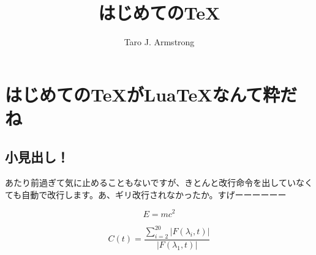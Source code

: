 \documentclass{ltjsarticle}
\begin{document}
\title{はじめての\TeX }
\author{Taro J. Armstrong}
\maketitle
\section{はじめての\TeX がLua\TeX なんて粋だね}

\subsection{小見出し！}
あたり前過ぎて気に止めることもないですが、きとんと改行命令を出していなくても自動で改行します。あ、ギリ改行されなかったか。すげーーーーーー

\begin{equation}
    E = mc^2
\end{equation}

\begin{equation}
C(t)=\frac{\sum_{i=2}^{20}|F(λ_i, t)|}{|F(λ_1, t)|}
\end{equation}

    
\end{document}
